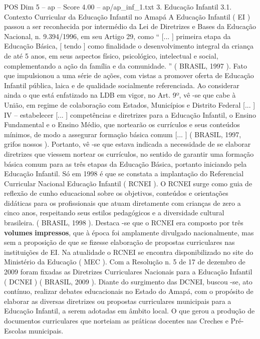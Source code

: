 \begin{textsample}{POS Dim 5 – ap – Score 4.00 – ap/ap\_inf\_1.txt}  \label{ex:f5_pos_169}
3.
Educação Infantil 3.1.
Contexto Curricular da Educação Infantil no Amapá A Educação Infantil ( EI ) passou a ser reconhecida por intermédio da Lei de Diretrizes e Bases da Educação Nacional, n. 9.394/1996, em seu Artigo 29, como “ [... ] primeira etapa da Educação Básica, [ tendo ] como finalidade o desenvolvimento integral da criança de até 5 anos, em seus aspectos físico, psicológico, intelectual e social, complementando a ação da família e da comunidade. ” ( BRASIL, 1997 ).
Fato que impulsionou a uma série de ações, com vistas a promover oferta de Educação Infantil pública, laica e de qualidade socialmente referenciada.
Ao considerar ainda o que está enfatizado na LDB em vigor, no Art. 9º, vê -se que cabe à União, em regime de colaboração com Estados, Municípios e Distrito Federal [... ] IV – estabelecer [... ] competências e diretrizes para a Educação Infantil, o Ensino Fundamental e o Ensino Médio, que nortearão os currículos e seus conteúdos mínimos, de modo a assegurar formação básica comum [... ] ( BRASIL, 1997, grifos nossos ).
Portanto, vê -se que estava indicada a necessidade de se elaborar diretrizes que viessem nortear os currículos, no sentido de garantir uma formação básica comum para as três etapas da Educação Básica, portanto iniciando pela Educação Infantil.
Só em 1998 é que se constata a implantação do Referencial Curricular Nacional Educação Infantil ( RCNEI ).
O RCNEI surge como guia de reflexão de cunho educacional sobre os objetivos, conteúdos e orientações didáticas para os profissionais que atuam diretamente com crianças de zero a cinco anos, respeitando seus estilos pedagógicos e a diversidade cultural brasileira. ( BRASIL, 1998 ).
Destaca -se que o RCNEI era composto por três \textbf{volumes} \textbf{impressos}, que à época foi amplamente divulgado nacionalmente, mas sem a proposição de que se fizesse elaboração de propostas curriculares nas instituições de EI.
Na atualidade o RCNEI se encontra disponibilizado no site do Ministério da Educação ( MEC ).
Com a Resolução n. 5 de 17 de dezembro de 2009 foram fixadas as Diretrizes Curriculares Nacionais para a Educação Infantil ( DCNEI ) ( BRASIL, 2009 ).
Diante do surgimento das DCNEI, buscou -se, ato contínuo, realizar debates educacionais no Estado do Amapá, com o propósito de elaborar as diversas diretrizes ou propostas curriculares municipais para a Educação Infantil, a serem adotadas em âmbito local.
O que gerou a produção de documentos curriculares que norteiam as práticas docentes nas Creches e Pré-Escolas municipais.

\end{textsample}
